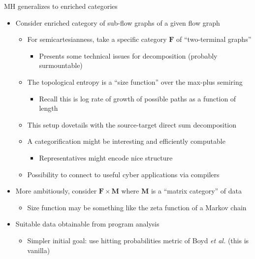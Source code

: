 \documentclass[usenames,dvipsnames,10pt,aspectratio=169]{beamer}
\begin{document}
\begin{frame}{MH generalizes to enriched categories}
	\begin{itemize}
		\item Consider enriched category of sub-flow graphs of a given flow graph
		\begin{itemize}
			\item For semicartesianness, take a specific category $\mathbf{F}$ of ``two-terminal graphs''
            		\begin{itemize}
            			\item Presents some technical issues for decomposition (probably surmountable)
            		\end{itemize}
            		\item The topological entropy is a ``size function'' over the max-plus semiring
            		\begin{itemize}
            			\item Recall this is log rate of growth of possible paths as a function of length
            		\end{itemize}
            		\item This setup dovetails with the source-target direct sum decomposition
            		\item A categorification might be interesting and efficiently computable
            		\begin{itemize}
            			\item Representatives might encode nice structure
            		\end{itemize}
            		\item Possibility to connect to useful cyber applications via compilers
		\end{itemize}
		\item More ambitiously, consider $\mathbf{F} \times \mathbf{M}$ where $\mathbf{M}$ is a  ``matrix category'' of data
		\begin{itemize}
			\item Size function may be something like the zeta function of a Markov chain
		\end{itemize}
		\item Suitable data obtainable from program analysis
		\begin{itemize}
			\item Simpler initial goal: use hitting probabilities metric of Boyd \emph{et al.} (this is vanilla)
		\end{itemize}
	\end{itemize}
\end{frame}
\end{document}
